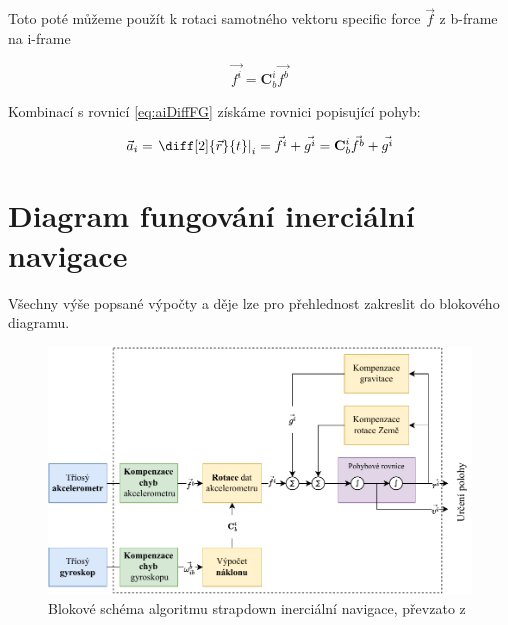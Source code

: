 Toto poté můžeme použít k rotaci samotného vektoru specific force $ \vec{f} $ z b-frame na i-frame

\begin{equation}
\vec{f^{i}} = \mathbf{C}_{b}^{i}\vec{f^{b}}
\end{equation}

Kombinací s rovnicí \ref{eq:aiDiffFG} získáme rovnici popisující pohyb:

\begin{equation}
\vec{a}_{i} = \left. \diff[2]{\vec{r}}{t} \right|_{i} = \vec{f^{i}} + \vec{g^{i}} = \mathbf{C}_{b}^{i}\vec{f^{b}} + \vec{g^{i}}
\end{equation}
\section{Diagram fungování inerciální navigace}
Všechny výše popsané výpočty a děje lze pro přehlednost zakreslit do blokového diagramu.

\begin{figure}[h]
    \centering
    \includegraphics[width=\textwidth]{obrazky/StrapdownBlock}
    \caption{Blokové schéma algoritmu strapdown inerciální navigace, převzato z \cite{Tittertonc2004} \cite{Grewal2013} }
\end{figure}
